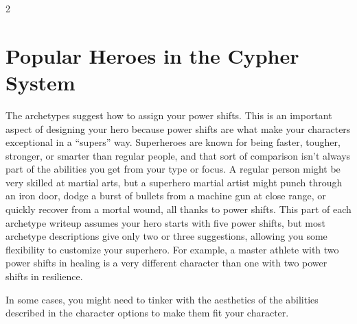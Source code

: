 \begin{multicols}{2}

\chapter{Popular Heroes in the Cypher System}

The archetypes suggest how to assign your power shifts. This is an important aspect of designing your hero because power shifts are what make your characters exceptional in a “supers” way. Superheroes are known for being faster, tougher, stronger, or smarter than regular people, and that sort of comparison isn’t always part of the abilities you get from your type or focus. A regular person might be very skilled at martial arts, but a superhero martial artist might punch through an iron door, dodge a burst of bullets from a machine gun at close range, or quickly recover from a mortal wound, all thanks to power shifts. This part of each archetype writeup assumes your hero starts with five power shifts, but most archetype descriptions give only two or three suggestions, allowing you some flexibility to customize your superhero. For example, a master athlete with two power shifts in healing is a very different character than one with two power shifts in resilience.

In some cases, you might need to tinker with the aesthetics of the abilities described in the character options to make them fit your character. 

\end{multicols} 

